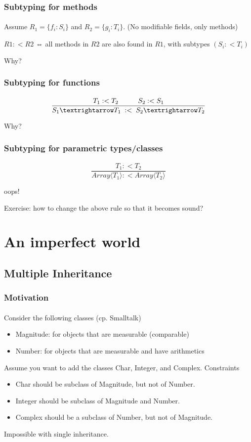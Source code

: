 \documentclass{beamer}
\begin{document}
\begin{frame}
\frametitle{Subtyping for methods}
\framesubtitle{}

Assume $R_1 = \{f_i : S_i\}$ and $R_2 = \{g_i : T_i\}$.
(No modifiable fields, only methods)

$R1 :< R2$ ⇔ all methods in $R2$ are also found in $R1$, with subtypes $(S_i :< T_i)$

Why?

\end{frame}


\begin{frame}
\frametitle{Subtyping for functions}
\framesubtitle{}

\[
\frac{\; T_1 :< T_2 \mbox{\hspace{1cm}}  S_2 :< S_1 \;}{S_1 → T_1 \; :< \; S_2 → T_2}
\]

Why?

\end{frame}


\begin{frame}
\frametitle{Subtyping for parametric types/classes}
\framesubtitle{}

\[
\frac{T_1 :< T_2 }{Array ⟨T_1⟩ :< Array ⟨ T_2 ⟩}
\]

\pause

oops!

\pause

Exercise: how to change the above rule so that it becomes sound?

\end{frame}






\section{An imperfect world}

\subsection{Multiple Inheritance}

\begin{frame}[fragile]
\frametitle{Motivation}
\framesubtitle{}
Consider the following classes (cp. Smalltalk)
\begin{itemize}
\item Magnitude: for objects that are measurable (comparable)
\item Number: for objects that are measurable and have arithmetics
\end{itemize}
Assume you want to add the classes Char, Integer, and Complex.
Constraints
\begin{itemize}
\item Char should be subclass of Magnitude, but not of Number.
\item Integer should be subclass of Magnitude and Number.
\item Complex should be a subclass of Number, but not of Magnitude.
\end{itemize}
Impossible with single inheritance.
\end{frame}
\end{document}
